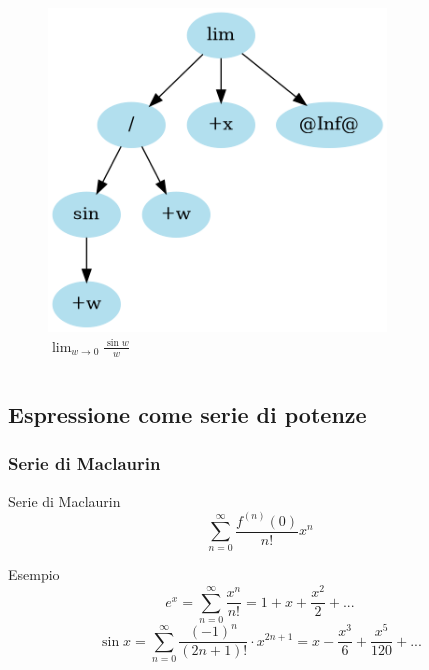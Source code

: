 \documentclass[aspectratio=149]{beamer}
\begin{document}
\begin{frame}
\begin{columns}
\begin{column}{0.45\textwidth}
\begin{figure}
					\includegraphics[width=0.8\textwidth]{pres_img/replaced2.png}
					\caption{\(\lim_{w \to 0}{\frac{\sin{w}}{w}}\)}
				\end{figure}
			\end{column}
		\end{columns}
	\end{frame}

	\subsection{Espressione come serie di potenze}
	
	\begin{frame}
		\frametitle{Serie di Maclaurin}
		\begin{block}{Serie di Maclaurin}
			\[
			\sum_{n=0}^{\infty}{\frac{f^{(n)}(0)}{n!} x^{n}}
			\] 
		\end{block}
		\begin{exampleblock}{Esempio}
			\[
				e^{x} = \sum_{n=0}^{\infty} \frac{x^{n}}{n!} = 1 + x + \frac{x^2}{2} + ...
			\]
			\[
				\sin{x} = \sum_{n=0}^{\infty} \frac{(-1)^{n}}{(2n + 1)!} \cdot x^{2n+1} = x - \frac{x^3}{6} + \frac{x^5}{120} + ...
			\]
		\end{exampleblock}
	\end{frame}
\end{document}

